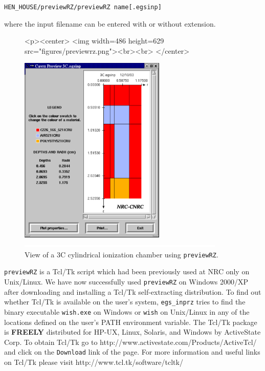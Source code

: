 \documentclass[12pt,twoside]{article}   %
\begin{document}
 {\tt HEN\_HOUSE/previewRZ/previewRZ name[.egsinp]}
 
\noindent where the input filename can be entered with or without extension. \\

\begin{figure}[h]
\begin{htmlonly}
\begin{rawhtml}
<p><center>
<img width=486 height=629 src="figures/previewrz.png"><br><br>
</center>
\end{rawhtml}
\end{htmlonly}
\begin{latexonly}
\begin{center}
\includegraphics[height=9cm]{figures/previewrz}
\end{center}
\end{latexonly}
\begin{center}
\includegraphics[height=1mm]{figures/fake2}
\end{center}
\caption{View of a 3C cylindrical ionization chamber using {\tt previewRZ}.}
\label{view}
\end{figure}

{\tt previewRZ} is a Tcl/Tk script 
which had been previously used at NRC only on Unix/Linux. We have now successfully used 
{\tt previewRZ} on Windows 2000/XP after downloading and installing a Tcl/Tk 
self-extracting distribution. 
To find out whether
Tcl/Tk is available on the user's system, {\tt egs\_inprz} tries to find the binary 
executable {\tt wish.exe} on Windows or {\tt wish} on Unix/Linux in any of the locations 
defined on the user's PATH environment
variable.
The Tcl/Tk package is {\bf FREELY} distributed for HP-UX, Linux, 
Solaris, and Windows by ActiveState Corp. 
To obtain  Tcl/Tk go to
{http://www.activestate.com/Products/ActiveTcl/}
and click on the {\tt Download} link of the page. For more information and useful links
on Tcl/Tk please visit
{http://www.tcl.tk/software/tcltk/}
\end{document}
